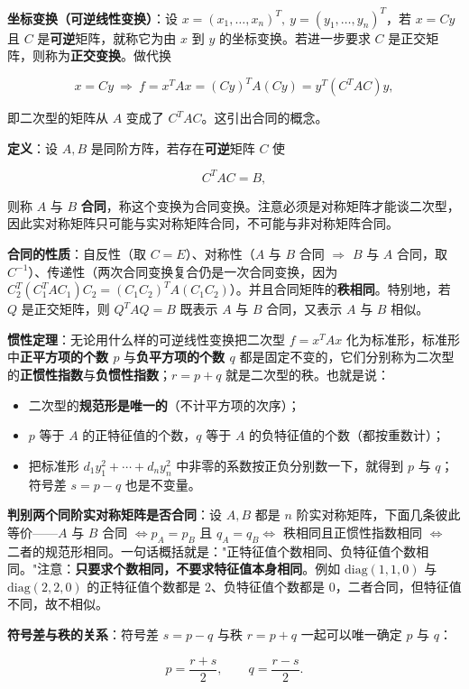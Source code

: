 \documentclass[11pt,openany,UTF8]{ctexbook}
\begin{document}
\textbf{坐标变换（可逆线性变换）}：设 $x=(x_1,\dots,x_n)^T,\ y=(y_1,\dots,y_n)^T$，若 $x=Cy$ 且 $C$ 是\textbf{可逆}矩阵，就称它为由 $x$ 到 $y$ 的坐标变换。若进一步要求 $C$ 是正交矩阵，则称为\textbf{正交变换}。做代换

\[x=Cy\ \Longrightarrow\ f=x^TAx=(Cy)^TA(Cy)=y^T(C^TAC)y,\]

即二次型的矩阵从 $A$ 变成了 $C^TAC$。这引出合同的概念。

\textbf{定义}：设 $A,B$ 是同阶方阵，若存在\textbf{可逆}矩阵 $C$ 使

\[C^TAC=B,\]

则称 $A$ 与 $B$ \textbf{合同}，称这个变换为合同变换。注意必须是对称矩阵才能谈二次型，因此实对称矩阵只可能与实对称矩阵合同，不可能与非对称矩阵合同。

\textbf{合同的性质}：自反性（取 $C=E$）、对称性（$A$ 与 $B$ 合同 $\Rightarrow$ $B$ 与 $A$ 合同，取 $C^{-1}$）、传递性（两次合同变换复合仍是一次合同变换，因为 $C_2^T(C_1^TAC_1)C_2=(C_1C_2)^TA(C_1C_2)$）。并且合同矩阵的\textbf{秩相同}。特别地，若 $Q$ 是正交矩阵，则 $Q^TAQ=B$ 既表示 $A$ 与 $B$ 合同，又表示 $A$ 与 $B$ 相似。

\textbf{惯性定理}：无论用什么样的可逆线性变换把二次型 $f=x^TAx$ 化为标准形，标准形中\textbf{正平方项的个数 $p$} 与\textbf{负平方项的个数 $q$} 都是固定不变的，它们分别称为二次型的\textbf{正惯性指数}与\textbf{负惯性指数}；$r=p+q$ 就是二次型的秩。也就是说：

\begin{itemize}
\item 二次型的\textbf{规范形是唯一的}（不计平方项的次序）；
\item $p$ 等于 $A$ 的正特征值的个数，$q$ 等于 $A$ 的负特征值的个数（都按重数计）；
\item 把标准形 $d_1y_1^2+\cdots+d_ny_n^2$ 中非零的系数按正负分别数一下，就得到 $p$ 与 $q$；符号差 $s=p-q$ 也是不变量。
\end{itemize}
\textbf{判别两个同阶实对称矩阵是否合同}：设 $A,B$ 都是 $n$ 阶实对称矩阵，下面几条彼此等价——$A$ 与 $B$ 合同 $\iff p_A=p_B$ 且 $q_A=q_B\iff$ 秩相同且正惯性指数相同 $\iff$ 二者的规范形相同。一句话概括就是："正特征值个数相同、负特征值个数相同。"注意：\textbf{只要求个数相同，不要求特征值本身相同}。例如 $\mathrm{diag}(1,1,0)$ 与 $\mathrm{diag}(2,2,0)$ 的正特征值个数都是 $2$、负特征值个数都是 $0$，二者合同，但特征值不同，故不相似。

\textbf{符号差与秩的关系}：符号差 $s=p-q$ 与秩 $r=p+q$ 一起可以唯一确定 $p$ 与 $q$：

\[p=\frac{r+s}{2},\qquad q=\frac{r-s}{2}.\]
\end{document}
